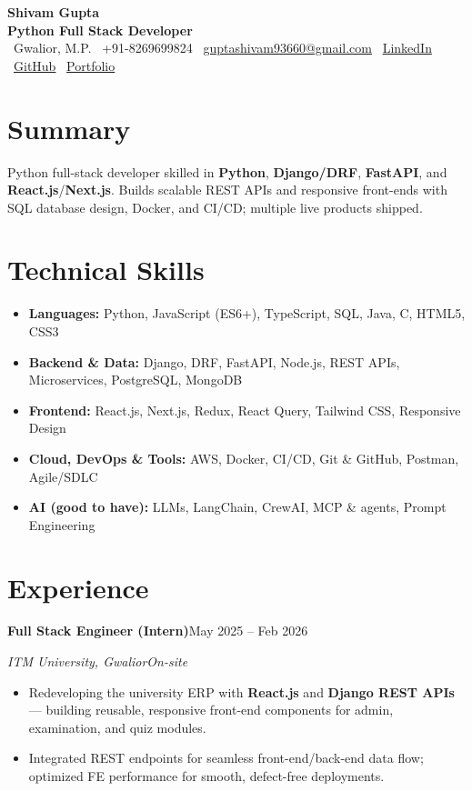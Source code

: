 \documentclass[a4paper,10pt]{article}
\newcommand{\entry}[4]{%
  \vspace{3pt}%
  \textbf{#1}\hfill #2\par
  \vspace{1pt}%
  \textit{#3}\hfill \textit{#4}\par
  \vspace{2pt}%
}
\begin{document}
\begin{center}
  {\Huge \textbf{Shivam Gupta}}\\[4pt]
  {\color{accent}\textbf{Python Full Stack Developer}}\\[5pt]
  {\small
  \faMapMarker~Gwalior, M.P. \quad
  \faPhone~+91-8269699824 \quad
  \faEnvelope~\href{mailto:guptashivam93660@gmail.com}{guptashivam93660@gmail.com} \quad
  \faLinkedin~\href{https://www.linkedin.com/in/ur-990q}{LinkedIn} \quad
  \faGithub~\href{https://github.com/Shivam990q}{GitHub} \quad
  \faGlobe~\href{https://shivam-portfolio-a1s4.onrender.com}{Portfolio}}
\end{center}

\section{Summary}
Python full-stack developer skilled in \textbf{Python}, \textbf{Django/DRF}, \textbf{FastAPI},
and \textbf{React.js}/\textbf{Next.js}. Builds scalable REST APIs and responsive front-ends with
SQL database design, Docker, and CI/CD; multiple live products shipped.

\section{Technical Skills}
\begin{itemize}[label={}, leftmargin=0pt, topsep=2pt, itemsep=2pt]
  \item \textbf{Languages:} Python, JavaScript (ES6+), TypeScript, SQL, Java, C, HTML5, CSS3
  \item \textbf{Backend \& Data:} Django, DRF, FastAPI, Node.js, REST APIs, Microservices, PostgreSQL, MongoDB
  \item \textbf{Frontend:} React.js, Next.js, Redux, React Query, Tailwind CSS, Responsive Design
  \item \textbf{Cloud, DevOps \& Tools:} AWS, Docker, CI/CD, Git \& GitHub, Postman, Agile/SDLC
  \item \textbf{AI (good to have):} LLMs, LangChain, CrewAI, MCP \& agents, Prompt Engineering
\end{itemize}

\section{Experience}
\entry{Full Stack Engineer (Intern)}{May 2025 -- Feb 2026}{ITM University, Gwalior}{On-site}
\begin{itemize}
  \item Redeveloping the university ERP with \textbf{React.js} and \textbf{Django REST APIs} ---
        building reusable, responsive front-end components for admin, examination, and quiz modules.
  \item Integrated REST endpoints for seamless front-end/back-end data flow; optimized FE
        performance for smooth, defect-free deployments.
\end{itemize}
\end{document}

